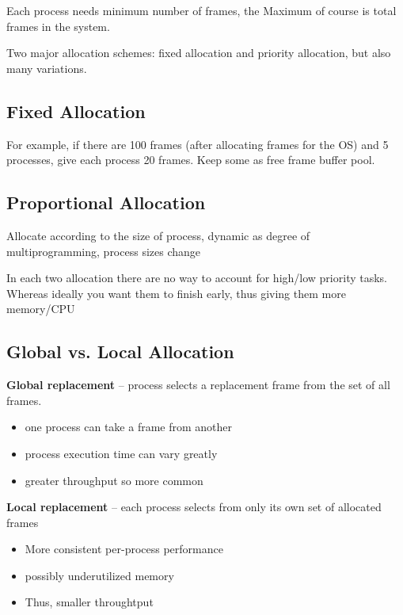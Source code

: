 Each process needs minimum number of frames, the Maximum of course is total frames in the system. 

Two major allocation schemes: fixed allocation and priority allocation, but also many variations.

\subsection{Fixed Allocation}

For example, if there are 100 frames (after
allocating frames for the OS) and 5 processes, give each process 20
frames. Keep some as free frame buffer pool.

\subsection{Proportional Allocation}

Allocate according to the size of process, dynamic as degree of multiprogramming, process sizes change


In each two allocation there are no way to account for high/low priority tasks.
Whereas ideally you want them to finish early, thus giving them more
memory/CPU

\subsection{Global vs. Local Allocation}

\textbf{Global replacement} – process selects a replacement frame from the set of all frames.

\begin{itemize}
    \item one process can take a frame from another
    \item process execution time can vary greatly
    \item greater throughput so more common
\end{itemize}

\textbf{Local replacement} – each process selects from only its own set of
allocated frames

\begin{itemize}
    \item More consistent per-process performance
    \item possibly underutilized memory
    \item Thus, smaller throughtput
\end{itemize}

